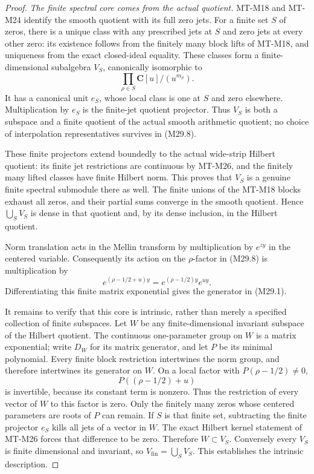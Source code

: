 \begin{proof}
\emph{The finite spectral core comes from the actual quotient.}
MT-M18 and MT-M24 identify the smooth quotient with its full
zero jets. For a finite set \(S\) of zeros, there is a unique
class with any prescribed jets at \(S\) and zero jets at
every other zero: its existence follows from the finitely
many block lifts of MT-M18, and uniqueness from the exact
closed-ideal equality. These classes form a finite-dimensional
subalgebra \(V_S\), canonically isomorphic to
\[
                     \prod_{\rho\in S}
                              \mathbf C[u]/(u^{m_\rho}).
                                                               \tag{M29.8}
\]
It has a canonical unit \(e_S\), whose local class is one
at \(S\) and zero elsewhere. Multiplication by \(e_S\) is
the finite-jet quotient projector. Thus \(V_S\) is both
a subspace and a finite quotient of the actual smooth
arithmetic quotient; no choice of interpolation
representatives survives in (M29.8).

These finite projectors extend boundedly to the actual
wide-strip Hilbert quotient: its finite jet restrictions
are continuous by MT-M26, and the finitely many lifted
classes have finite Hilbert norm. This proves that \(V_S\)
is a genuine finite spectral submodule there as well.
The finite unions of the MT-M18 blocks exhaust all zeros,
and their partial sums converge in the smooth quotient.
Hence \(\bigcup_S V_S\) is dense in that quotient and,
by its dense inclusion, in the Hilbert quotient.

Norm translation acts in the Mellin transform by
multiplication by \(e^{zy}\) in the centered variable.
Consequently its action on the \(\rho\)-factor in (M29.8)
is multiplication by
\[
                  e^{(\rho-1/2+u)y}
                   =e^{(\rho-1/2)y}e^{uy}.
 \]
Differentiating this finite matrix exponential gives
the generator in (M29.1).

It remains to verify that this core is intrinsic, rather
than merely a specified collection of finite subspaces.
Let \(W\) be any finite-dimensional invariant subspace of
the Hilbert quotient. The continuous one-parameter group
on \(W\) is a matrix exponential; write \(D_W\) for its
matrix generator, and let \(P\) be its minimal polynomial.
Every finite block restriction intertwines the norm
group, and therefore intertwines its generator on \(W\).
On a local factor with \(P(\rho-1/2)\ne0\),
\[
                 P((\rho-1/2)+u)
 \]
is invertible, because its constant term is nonzero.
Thus the restriction of every vector of \(W\) to this
factor is zero. Only the finitely many zeros whose
centered parameters are roots of \(P\) can remain.
If \(S\) is that finite set, subtracting the finite
projector \(e_S\) kills all jets of a vector in \(W\).
The exact Hilbert kernel statement of MT-M26 forces
that difference to be zero. Therefore \(W\subset V_S\).
Conversely every \(V_S\) is finite dimensional and
invariant, so \(V_{\mathrm{fin}}=\bigcup_S V_S\).
This establishes the intrinsic description.


\end{proof}
